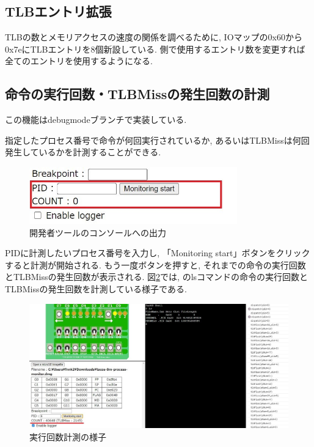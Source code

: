 \subsection{TLBエントリ拡張}

TLBの数とメモリアクセスの速度の関係を調べるために, IOマップの0x60から0x7eにTLBエントリを8個新設している. \tacos 側で使用するエントリ数を変更すれば全てのエントリを使用するようになる.

\subsection{命令の実行回数・TLBMissの発生回数の計測}

この機能はdebugmodeブランチで実装している.

指定したプロセス番号で命令が何回実行されているか, あるいはTLBMissは何回発生しているかを計測することができる. 

\begin{figure}[H]
    \centering
    \includegraphics[width=9cm]{"figs/chapter3-monitor.jpg"}
    \caption{開発者ツールのコンソールへの出力} \label{fig:ch3-monitor}
\end{figure}

PIDに計測したいプロセス番号を入力し, 「Monitoring start」ボタンをクリックすると計測が開始される. もう一度ボタンを押すと, それまでの命令の実行回数とTLBMissの発生回数が表示される. 図\ref{fig:ch3-monitor2}では, \tacos のlsコマンドの命令の実行回数とTLBMissの発生回数を計測している様子である.

\begin{figure}[H]
    \centering
    \includegraphics[width=14cm]{"figs/chapter3-monitor2.jpg"}
    \caption{実行回数計測の様子} \label{fig:ch3-monitor2}
\end{figure}